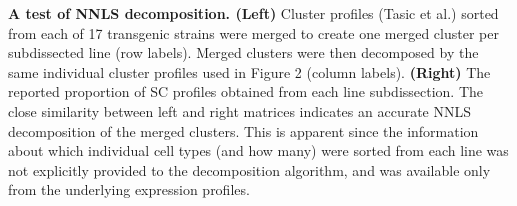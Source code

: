 \textbf{A test of NNLS decomposition. (Left)} Cluster profiles (Tasic et al.) sorted from each of 17 transgenic strains were merged to create one merged cluster per subdissected line (row labels). Merged clusters were then decomposed by the same individual cluster profiles used in Figure 2 (column labels). \textbf{(Right)} The reported proportion of SC profiles obtained from each line subdissection. The close similarity between left and right matrices indicates an accurate NNLS decomposition of the merged clusters. This is apparent since the information about which individual cell types (and how many) were sorted from each line was not explicitly provided to the decomposition algorithm, and was available only from the underlying expression profiles.